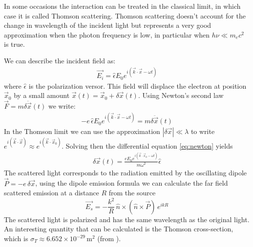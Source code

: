 In some occasions the interaction can be treated in the classical limit, in which case it is called Thomson scattering. Thomson scattering doesn't account for the change in wavelength of the incident light but represents a very good approximation when the photon frequency is low, in particular when $h\nu \ll m_e c^2$ is true.

We can describe the incident field as:
\begin{align}
\vec{E_i}= \hat{\epsilon} E_0 e^{i(\vec{k} \cdot \vec{x}-\omega t)}
\end{align}
where $ \hat{\epsilon}$ is the polarization versor. This field will displace the electron at position $\vec{x}_0$ by a small amount $\vec{x}(t) = \vec{x}_0+\delta \vec{x}(t)$. Using Newton's second law $\vec{F}=m \delta\ddot{\vec{x}}(t)$ we write:
\begin{align}
-e\,\hat{\epsilon} E_0 e^{i(\vec{k} \cdot \vec{x}-\omega t)} = m\delta\ddot{\vec{x}}(t)
\label{eq:newton}
\end{align}
In the Thomson limit we can use the approximation $\left|\delta\vec{x}\right| \ll \lambda$ to write $e^{i(\vec{k} \cdot \vec{x})} \approx e^{i(\vec{k} \cdot \vec{x}_0)}$. Solving then the differential equation \ref{eq:newton} yields
\begin{align}
\delta \vec{x}(t) = \frac{eE_0 e^{i(\vec{k} \cdot \vec{x}_0-\omega t)}}{m \omega^2} \hat{\epsilon}
\end{align}
The scattered light corresponds to the radiation emitted by the oscillating dipole $\vec{P}=-e\,\delta \vec{x}$, using the dipole emission formula \parencite{jackson_classical_1999} we can calculate the far field scattered emission at a distance $R$ from the source
\begin{equation}
\vec{E_s} = -\frac{k^2}{R} \,\hat{n} \times (\hat{n} \times \vec{P}) \,e^{ikR}
\end{equation}
The scattered light is polarized and has the same wavelength as the original light. An interesting quantity that can be calculated is the Thomson cross-section, which is $\sigma_T \approx 6.652 \times 10^{-29}\,\mathrm{m}^2$ (from \parencite{jackson_classical_1999}).

